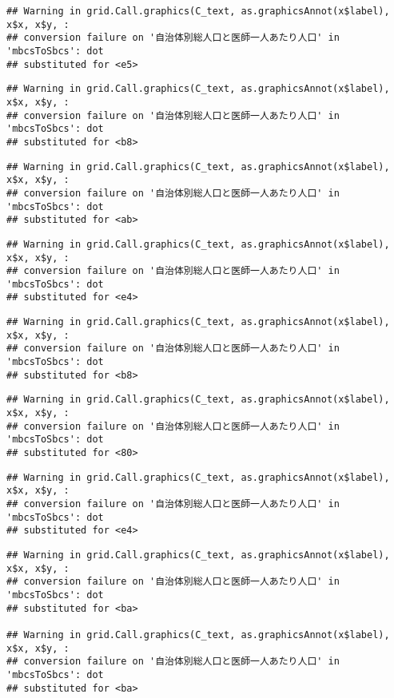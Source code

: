 \documentclass[
]{article}
\begin{document}
\begin{verbatim}
## Warning in grid.Call.graphics(C_text, as.graphicsAnnot(x$label), x$x, x$y, :
## conversion failure on '自治体別総人口と医師一人あたり人口' in 'mbcsToSbcs': dot
## substituted for <e5>
\end{verbatim}

\begin{verbatim}
## Warning in grid.Call.graphics(C_text, as.graphicsAnnot(x$label), x$x, x$y, :
## conversion failure on '自治体別総人口と医師一人あたり人口' in 'mbcsToSbcs': dot
## substituted for <b8>
\end{verbatim}

\begin{verbatim}
## Warning in grid.Call.graphics(C_text, as.graphicsAnnot(x$label), x$x, x$y, :
## conversion failure on '自治体別総人口と医師一人あたり人口' in 'mbcsToSbcs': dot
## substituted for <ab>
\end{verbatim}

\begin{verbatim}
## Warning in grid.Call.graphics(C_text, as.graphicsAnnot(x$label), x$x, x$y, :
## conversion failure on '自治体別総人口と医師一人あたり人口' in 'mbcsToSbcs': dot
## substituted for <e4>
\end{verbatim}

\begin{verbatim}
## Warning in grid.Call.graphics(C_text, as.graphicsAnnot(x$label), x$x, x$y, :
## conversion failure on '自治体別総人口と医師一人あたり人口' in 'mbcsToSbcs': dot
## substituted for <b8>
\end{verbatim}

\begin{verbatim}
## Warning in grid.Call.graphics(C_text, as.graphicsAnnot(x$label), x$x, x$y, :
## conversion failure on '自治体別総人口と医師一人あたり人口' in 'mbcsToSbcs': dot
## substituted for <80>
\end{verbatim}

\begin{verbatim}
## Warning in grid.Call.graphics(C_text, as.graphicsAnnot(x$label), x$x, x$y, :
## conversion failure on '自治体別総人口と医師一人あたり人口' in 'mbcsToSbcs': dot
## substituted for <e4>
\end{verbatim}

\begin{verbatim}
## Warning in grid.Call.graphics(C_text, as.graphicsAnnot(x$label), x$x, x$y, :
## conversion failure on '自治体別総人口と医師一人あたり人口' in 'mbcsToSbcs': dot
## substituted for <ba>

## Warning in grid.Call.graphics(C_text, as.graphicsAnnot(x$label), x$x, x$y, :
## conversion failure on '自治体別総人口と医師一人あたり人口' in 'mbcsToSbcs': dot
## substituted for <ba>
\end{verbatim}
\end{document}
